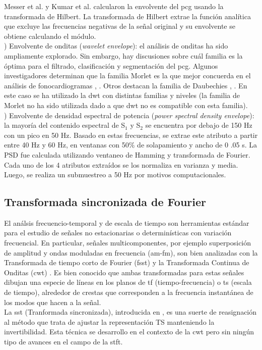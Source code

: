 Messer et al. \cite{ref:messer} y Kumar et al. \cite{ref:kumar} calcularon la envolvente del \acrshort{pcg} usando
la transformada de Hilbert. La transformada de Hilbert extrae la función analítica que excluye las frecuencias
negativas de la señal original y su envolvente se obtiene calculando el módulo. \\
) Envolvente de onditas (\textit{wavelet envelope}): el análisis de onditas ha sido ampliamente explorado.
Sin embargo, hay discusiones sobre cuál familia es la óptima para el filtrado, clasificación y segmentación del
\acrshort{pcg}. Algunos investigadores determinan que la familia Morlet es la que mejor concuerda en el análisis de
fonocardiogramas \cite{ref:oskiper-watrous}, \cite{ref:ergen-tatar-gulcur}. Otros destacan la familia de Daubechies
\cite{ref:liang-sakari-iiro}, \cite{ref:gupta}. En este caso se ha utilizado la \acrshort{dwt} con distintas
familias y niveles (la familia de Morlet no ha sido utilizada dado a que \acrshort{dwt} no es compatible con esta
familia). \\
) Envolvente de densidad espectral de potencia (\textit{power spectral density envelope}): la mayoría del
contenido espectral de S$_1$ y S$_2$ se encuentra por debajo de 150 Hz con un pico en 50 Hz. Basado en estas
frecuencias, se extrae este atributo a partir entre 40 Hz y 60 Hz, en ventanas con 50\% de solapamiento y ancho de 0
.05 s. La PSD fue calculada utilizando ventaneo de Hamming y transformada de Fourier. \\
\indent Cada uno de los 4 atributos extraídos se los normaliza en varianza y media. Luego, se realiza un submuestreo
a 50 Hz por motivos computacionales.

\subsection*{Transformada sincronizada de Fourier}

El análsis frecuencio-temporal y de escala de tiempo son herramientas estándar para el estudio de señales no
estacionarias o determinísticas con variación frecuencial. En particular, señales multicomponentes, por ejemplo
superposición de amplitud y ondas moduladas en frecuencia (\acrshort{am}-\acrshort{fm}), son bien analizadas con la
Transformada de tiempo corto de Fourier (\acrshort{fsst}) \cite{ref:gabor} y la Transformada Continua de Onditas
(\acrshort{cwt}) \cite{ref:grossmann-morlet}. Es bien conocido que ambas transformadas para estas señales dibujan
una especie de líneas en los planos de \acrshort{tf} (tiempo-frecuencia) o \acrshort{ts} (escala de tiempo),
alrededor de crestas que corresponden a la frecuencia instantánea de los modos que hacen a la señal. \\
\indent La \acrshort{sst} (Tranformada sincronizada), introducida en \cite{ref:daubechies-maes}, es una suerte de
reasignación al método que trata de ajustar la representación TS manteniendo la invertibilidad. Esta técnica se
desarrollo en el contexto de la \acrshort{cwt} pero sin ningún tipo de avances en el campo de la \acrshort{stft}.

